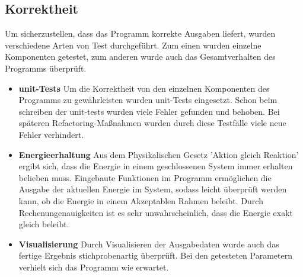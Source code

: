 \documentclass[
	12pt,
	a4paper,
	BCOR10mm,
	DIV14,
	headsepline,
]{scrreprt}
\begin{document}
\subsection{Korrektheit}
Um sicherzustellen, dass das Programm korrekte Ausgaben liefert, wurden verschiedene Arten von Test durchgeführt. Zum einen wurden einzelne Komponenten getestet, zum anderen wurde auch das Gesamtverhalten des Programms überprüft.
\begin{itemize}
	\item \textbf{unit-Tests} Um die Korrektheit von den einzelnen Komponenten des Programms zu gewährleisten wurden unit-Tests eingesetzt. Schon beim schreiben der unit-tests wurden viele Fehler gefunden und behoben. Bei späteren Refactoring-Maßnahmen wurden durch diese Testfälle viele neue Fehler verhindert.
	\item \textbf{Energieerhaltung} Aus dem Physikalischen Gesetz 'Aktion gleich Reaktion' ergibt sich, dass die Energie in einem geschlossenen System immer erhalten belieben muss. Eingebaute Funktionen im Programm ermöglichen die Ausgabe der aktuellen Energie im System, sodass leicht überprüft werden kann, ob die Energie in einem Akzeptablen Rahmen beleibt. Durch Rechenungenauigkeiten ist es sehr unwahrscheinlich, dass die Energie exakt gleich beleibt.
	\item \textbf{Visualisierung} Durch Visualisieren der Ausgabedaten wurde auch das fertige Ergebnis stichprobenartig überprüft. Bei den getesteten Parametern verhielt sich das Programm wie erwartet.
\end{itemize}
\end{document}
